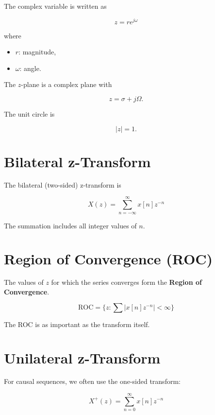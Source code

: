 The complex variable is written as

\[
\boxed{
z=re^{j\omega}
}
\]

where

\begin{itemize}
\item \(r\): magnitude,
\item \(\omega\): angle.
\end{itemize}

The \(z\)-plane is a complex plane with

\[
z=\sigma+j\Omega.
\]

The unit circle is

\[
\boxed{
|z|=1.
}
\]


\section{Bilateral z-Transform}

The bilateral (two-sided) z-transform is

\[
\boxed{
X(z)=
\sum_{n=-\infty}^{\infty}
x[n]z^{-n}
}
\]

The summation includes all integer values of \(n\).


\section{Region of Convergence (ROC)}

The values of \(z\) for which the series converges form the
\textbf{Region of Convergence}.

\[
\boxed{
\text{ROC}=
\{z:\sum |x[n]z^{-n}|<\infty\}
}
\]

The ROC is as important as the transform itself.


\section{Unilateral z-Transform}

For causal sequences, we often use the one-sided transform:

\[
\boxed{
X^+(z)=
\sum_{n=0}^{\infty}
x[n]z^{-n}
}
\]

